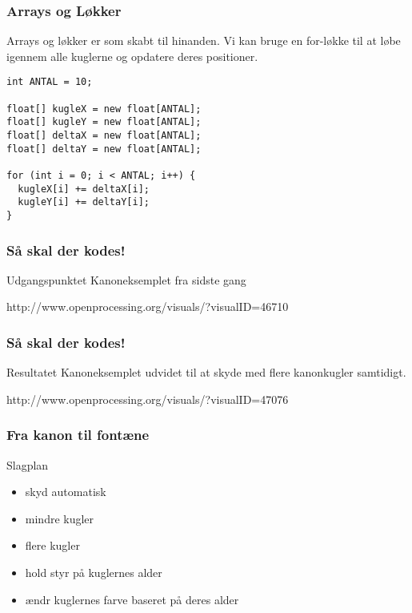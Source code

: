 \documentclass{beamer}
\begin{document}
\begin{frame}[fragile]
  \frametitle{Arrays og Løkker}
  
  Arrays og løkker er som skabt til hinanden. Vi kan bruge en for-løkke til 
  at løbe igennem alle kuglerne og opdatere deres positioner.

\begin{verbatim}
int ANTAL = 10;

float[] kugleX = new float[ANTAL];
float[] kugleY = new float[ANTAL];
float[] deltaX = new float[ANTAL];
float[] deltaY = new float[ANTAL];

for (int i = 0; i < ANTAL; i++) {
  kugleX[i] += deltaX[i];
  kugleY[i] += deltaY[i];
}
\end{verbatim}
  
   
\end{frame}

\begin{frame}[fragile]
  \frametitle{Så skal der kodes!}
  
  \begin{block}{Udgangspunktet}
  Kanoneksemplet fra sidste gang
  
  http://www.openprocessing.org/visuals/?visualID=46710
  \end{block}
    
\end{frame}


\begin{frame}[fragile]
  \frametitle{Så skal der kodes!}
      
  \begin{block}{Resultatet}
  Kanoneksemplet udvidet til at skyde med flere kanonkugler samtidigt.
  
  http://www.openprocessing.org/visuals/?visualID=47076
  \end{block}

\end{frame}


\begin{frame}[fragile]
  \frametitle{Fra kanon til fontæne}
  
  \begin{block}{Slagplan}
    \begin{itemize}
    \item skyd automatisk
    \item mindre kugler
    \item flere kugler
    \item hold styr på kuglernes alder
    \item ændr kuglernes farve baseret på deres alder
    \end{itemize}
  \end{block}
    
\end{frame}
\end{document}
